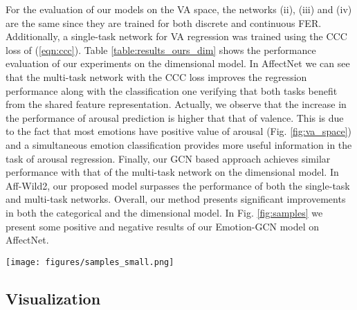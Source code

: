 \documentclass[a4paper, 10pt, conference]{ieeeconf}      \usepackage{FG2021}
\begin{document}
For the evaluation of our models on the VA space, the networks (ii), (iii) and (iv) are the same since they are trained for both discrete and continuous FER. Additionally, a single-task network for VA regression was trained using the CCC loss of (\ref{eqn:ccc}). Table \ref{table:results_ours_dim} shows the performance evaluation of our experiments on the dimensional model. In AffectNet we can see that the multi-task network with the CCC loss improves the regression performance along with the classification one verifying that both tasks benefit from the shared feature representation. Actually, we observe that the increase in the performance of arousal prediction is higher that that of valence. This is due to the fact that most emotions have positive value of arousal (Fig. \ref{fig:va_space}) and a simultaneous emotion classification provides more useful information in the task of arousal regression. Finally, our GCN based approach achieves similar performance with that of the multi-task network on the dimensional model. In Aff-Wild2, our proposed model surpasses the performance of both the single-task and multi-task networks. Overall, our method presents significant improvements in both the categorical and the dimensional model. In Fig. \ref{fig:samples} we present some positive and negative results of our Emotion-GCN model on AffectNet.

\begin{figure*}[t]
    \centering
    \texttt{[image: figures/samples\_small.png]}
    \caption{Predictions of our models on samples of AffectNet. The first column indicates the ground truth values. The second and the third column present the predictions of the multi-task network trained with CCC loss and our Emotion-GCN respectively. To examine which network better exploits the emotional dependencies, we selected samples where the predictions of the networks on the dimensional model are close. In the first four samples our Emotion-GCN model successfully recognizes the depicted emotion while the multi-task network fails indicating that our proposed model effectively captured the dependencies presented in the VA space (Fig. \ref{fig:va_space}). However, there are cases where our network fails (last two samples).}
    \label{fig:samples}
\end{figure*}

\subsection{Visualization}
\end{document}
